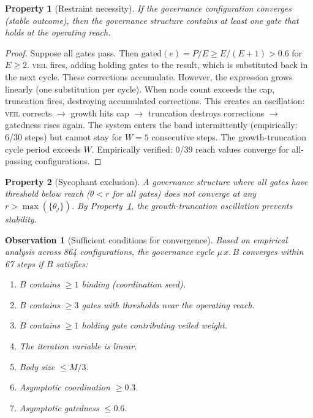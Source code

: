 \documentclass[sigconf,nonacm]{acmart}
\newtheorem{property}{Property}
\newtheorem{observation}{Observation}
\begin{document}
\begin{property}[Restraint necessity]\label{prop:restraint}
If the governance configuration converges (stable outcome), then the
governance structure contains at least one gate that holds at the
operating reach.
\end{property}

\begin{proof}
Suppose all gates pass. Then $\mathrm{gated}(e) = P/E \geq E/(E{+}1) > 0.6$
for $E \geq 2$. \textsc{veil} fires, adding holding gates to the result,
which is substituted back in the next cycle. These corrections
accumulate. However, the expression grows linearly (one substitution per
cycle). When node count exceeds the cap, truncation fires, destroying
accumulated corrections. This creates an oscillation:
\textsc{veil} corrects $\to$ growth hits cap $\to$ truncation destroys
corrections $\to$ gatedness rises again. The system enters the band
intermittently (empirically: 6/30 steps) but cannot stay for $W = 5$
consecutive steps. The growth-truncation cycle period exceeds $W$.
Empirically verified: 0/39 reach values converge for all-passing
configurations.
\end{proof}

\begin{property}[Sycophant exclusion]\label{prop:sycophant}
A governance structure where all gates have threshold below reach
($\theta < r$ for all gates) does not converge at any $r > \max(\{\theta_j\})$.
By Property~\ref{prop:restraint}, the growth-truncation oscillation
prevents stability.
\end{property}

\begin{observation}[Sufficient conditions for convergence]\label{obs:convergence}
Based on empirical analysis across 864 configurations, the governance
cycle $\mu\,x.\,B$ converges within 67 steps if $B$ satisfies:
\begin{enumerate}[label=\textup{H\arabic*},leftmargin=*]
  \item $B$ contains $\geq 1$ binding (coordination seed).
  \item $B$ contains $\geq 3$ gates with thresholds near the operating reach.
  \item $B$ contains $\geq 1$ holding gate contributing veiled weight.
  \item The iteration variable is linear.
  \item Body size $\leq M/3$.
  \item Asymptotic coordination $\geq 0.3$.
  \item Asymptotic gatedness $\leq 0.6$.
\end{enumerate}
\end{observation}
\end{document}
